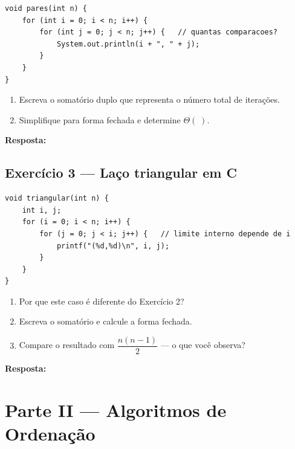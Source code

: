 \documentclass[12pt, a4paper]{article}
\newenvironment{resposta}{%
    \begin{mdframed}[linecolor=black!30, backgroundcolor=white,
                     innertopmargin=10pt, innerbottommargin=30pt,
                     skipabove=6pt]
    \textbf{Resposta:}\\[4pt]
}{%
    \end{mdframed}
}
\begin{document}
\begin{lstlisting}[style=javastyle]
void pares(int n) {
    for (int i = 0; i < n; i++) {
        for (int j = 0; j < n; j++) {   // quantas comparacoes?
            System.out.println(i + ", " + j);
        }
    }
}
\end{lstlisting}

\begin{enumerate}[label=(\alph*)]
    \item Escreva o somatório duplo que representa o número total de iterações.
    \item Simplifique para forma fechada e determine $\Theta(\;)$.
\end{enumerate}

\begin{resposta}
\vspace{3cm}
\end{resposta}

\subsection*{Exercício 3 — Laço triangular em C}

\begin{lstlisting}[style=cstyle]
void triangular(int n) {
    int i, j;
    for (i = 0; i < n; i++) {
        for (j = 0; j < i; j++) {   // limite interno depende de i
            printf("(%d,%d)\n", i, j);
        }
    }
}
\end{lstlisting}

\begin{enumerate}[label=(\alph*)]
    \item Por que este caso é diferente do Exercício 2?
    \item Escreva o somatório e calcule a forma fechada.
    \item Compare o resultado com $\dfrac{n(n-1)}{2}$ — o que você observa?
\end{enumerate}

\begin{resposta}
\vspace{3.5cm}
\end{resposta}

\newpage
\section*{Parte II — Algoritmos de Ordenação}
\end{document}
